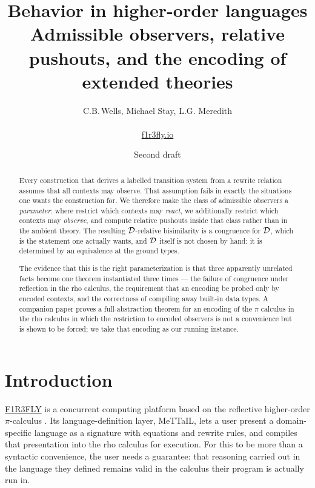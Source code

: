 \documentclass{article}
\title{Behavior in higher-order languages\\[0.3em]
\large Admissible observers, relative pushouts, and the encoding of extended theories}
\author{C.B.\,Wells, Michael Stay, L.G. Meredith\\~\\ \url{f1r3fly.io}}
\date{Second draft}
\begin{document}
\maketitle

\begin{abstract}
    Every construction that derives a labelled transition system from a
    rewrite relation assumes that all contexts may observe. That
    assumption fails in exactly the situations one wants the construction
    for. We therefore make the class of admissible observers a
    \emph{parameter}: where \citet{lm} restrict which contexts may
    \emph{react}, we additionally restrict which contexts may
    \emph{observe}, and compute relative pushouts inside that class
    rather than in the ambient theory. The resulting $\mathcal{D}$-relative
    bisimilarity is a congruence for $\mathcal{D}$, which is the statement one
    actually wants, and $\mathcal{D}$ itself is not chosen by hand: it is
    determined by an equivalence at the ground types.

    The evidence that this is the right parameterization is that three
    apparently unrelated facts become one theorem instantiated three
    times --- the failure of congruence under reflection in the rho
    calculus, the requirement that an encoding be probed only by encoded
    contexts, and the correctness of compiling away built-in data types.
    A companion paper \citep{nowns} proves a full-abstraction theorem for
    an encoding of the $\pi$ calculus in the rho calculus in which the
    restriction to encoded observers is not a convenience but is shown to
    be forced; we take that encoding as our running instance.
\end{abstract}

\tableofcontents

\newpage

\section{Introduction}

\href{https://github.com/F1R3FLY-io}{F1R3FLY} is a concurrent computing platform based on the reflective higher-order $\pi$-calculus \citep{rho}. Its language-definition layer, MeTTaIL, lets a user present a domain-specific language as a signature with equations and rewrite rules, and compiles that presentation into the rho calculus for execution. For this to be more than a syntactic convenience, the user needs a guarantee: that reasoning carried out in the language they defined remains valid in the calculus their program is actually run in.
\end{document}
